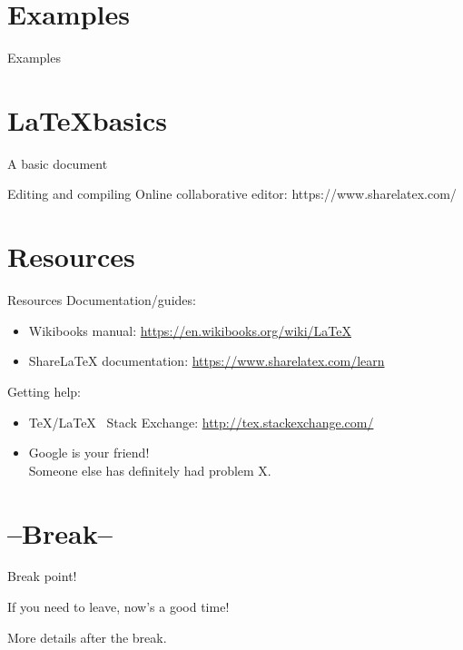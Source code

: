 \documentclass[xcolor={dvipsnames}]{beamer}
\begin{document}
\section{Examples}
\begin{frame}{Examples}
\end{frame}

\section{\LaTeX basics}
\begin{frame}{A basic document}
\end{frame}

\begin{frame}{Editing and compiling}
%
Online collaborative editor: https://www.sharelatex.com/
\end{frame}

\section{Resources}
\label{resources}
\begin{frame}{Resources}
Documentation/guides:
\begin{itemize}
\item Wikibooks manual: \url{https://en.wikibooks.org/wiki/LaTeX}
\item ShareLaTeX documentation: \url{https://www.sharelatex.com/learn}
\end{itemize}
\vfill
Getting help:
\begin{itemize}
\item \TeX/\LaTeX~ Stack Exchange: \url{http://tex.stackexchange.com/}
\item Google is your friend!\\Someone else has definitely had problem X.
\end{itemize}
\end{frame}

\section{--Break--}
\begin{frame}{Break point!}
\begin{block}{}
\begin{center}
If you need to leave, now's a good time!

More details after the break.
\end{center}
\end{block}
\end{frame}
\end{document}
